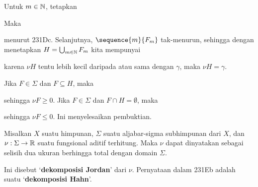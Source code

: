 {\medskip 
      
 Untuk $m\in\Bbb N$, tetapkan 
      
      
\noindent Maka 
      
      
\noindent menurut 231Dc. 
Selanjutnya, $\sequence{m}{F_m}$ tak-menurun, sehingga dengan menetapkan 
$H=\bigcup_{m\in\Bbb N}F_m$ kita mempunyai 
      
      
\noindent karena $\nu H$ 
tentu lebih kecil daripada atau sama dengan $\gamma$, maka $\nu H=\gamma$. 
      
\medskip

 Jika $F\in\Sigma$ dan $F\subseteq H$, maka 
      
      
\noindent sehingga $\nu F\ge 0$.   Jika $F\in\Sigma$ dan $F\cap 
H=\emptyset$, maka 
      
      
\noindent sehingga $\nu F\le 
0$.   Ini menyelesaikan pembuktian. 
}%
      
      
 Misalkan $X$ suatu himpunan, $\Sigma$ suatu 
aljabar-sigma subhimpunan dari $X$, dan $\nu:\Sigma\to\Bbb R$ suatu 
fungsional aditif terhitung.   Maka $\nu$ dapat dinyatakan sebagai selisih 
dua ukuran berhingga total dengan domain $\Sigma$. 
      
      
\medskip 
      
 Ini disebut `{\bf dekomposisi Jordan}' dari 
$\nu$.   Pernyataan dalam 231Eb adalah suatu `{\bf dekomposisi Hahn}'. 
      
      
      

